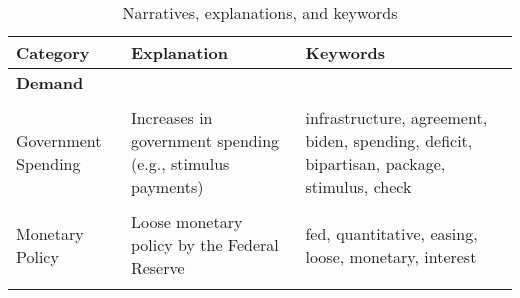 
\begin{table}
	\caption{Narratives, explanations, and keywords}\label{table:narratives}
	\smallbreak
	\begin{scriptsize}
		\begin{tabular}[htp]{p{3.5cm}|p{5cm}|p{5cm}}		
			\textbf{Category}        & \textbf{Explanation}                                                                                                                                                                            & \textbf{Keywords}                                                                                                                           \\ \toprule 
			\textbf{Demand}          &                                                                                                                                                                                                 &                                                                                                                                             \\ \hline \\[0.02cm]
			Government Spending      & Increases in government spending (e.g., stimulus payments)                                                                                                                                               & infrastructure, agreement, biden, spending, deficit, bipartisan, package, stimulus, check                                                                     \\ \\[0.02cm]
			Monetary Policy          & Loose monetary policy by the Federal Reserve                                                                                                                                                   & fed, quantitative, easing, loose, monetary, interest                                                                                        \\ \\[0.02cm]
			

\end{tabular}
\end{scriptsize}
\end{table}
